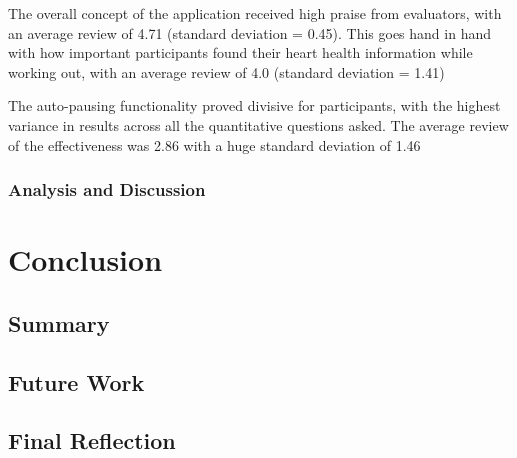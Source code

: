 \documentclass{l4proj}
\begin{document}
The overall concept of the application received high praise from evaluators, with an average review of 4.71 (standard deviation = 0.45). This goes hand in hand with how important participants found their heart health information while working out, with an average review of 4.0 (standard deviation = 1.41)

The auto-pausing functionality proved divisive for participants, with the highest variance in results across all the quantitative questions asked. The average review of the effectiveness was 2.86 with a huge standard deviation of 1.46

\subsection{Analysis and Discussion}

\chapter{Conclusion}    

\section{Summary}

\section{Future Work}

\section{Final Reflection}

%
% 
\end{document}
